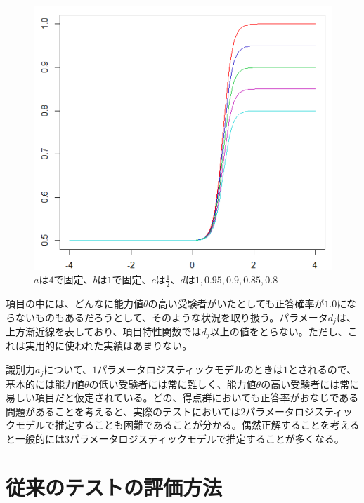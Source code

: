 \documentclass[12pt]{jarticle}
\numberwithin{equation}{subsection}
\begin{document}
\begin{description}
\begin{figure}[H]
  \includegraphics[bb = 500 100 1 1,scale = 0.25]{D.png}
  \vspace{1cm}
  \caption{$a$は$4$で固定、$b$は$1$で固定、$c$は$\displaystyle \frac{1}{2}$、$d$は$1, 0.95, 0.9, 0.85, 0.8$}
\end{figure}
  項目の中には、どんなに能力値$\theta$の高い受験者がいたとしても正答確率が$1.0$にならないものもあるだろうとして、そのような状況を取り扱う。パラメータ$d_j$は、上方漸近線を表しており、項目特性関数では$d_j$以上の値をとらない。ただし、これは実用的に使われた実績はあまりない。
\end{description}

識別力$a_j$について、$1$パラメータロジスティックモデルのときは$1$とされるので、基本的には能力値$\theta$の低い受験者には常に難しく、能力値$\theta$の高い受験者には常に易しい項目だと仮定されている。どの、得点群においても正答率がおなじである問題があることを考えると、実際のテストにおいては$2$パラメータロジスティックモデルで推定することも困難であることが分かる。偶然正解することを考えると一般的には$3$パラメータロジスティックモデルで推定することが多くなる。
\section{従来のテストの評価方法}
\end{document}
